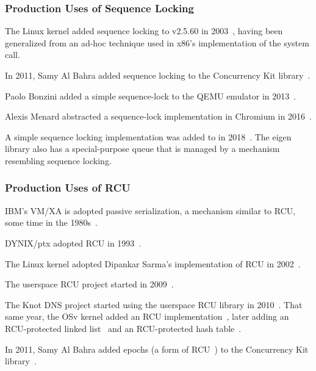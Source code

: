 \subsubsection{Production Uses of Sequence Locking}
\label{sec:defer:Production Uses of Sequence Locking}

The Linux kernel added sequence locking to v2.5.60 in
2003~\cite{JonathanCorbet2003seqlock}, having been generalized from
an ad-hoc technique used in x86's implementation of the
 system call.

In 2011, Samy Al Bahra added sequence locking to the Concurrency Kit
library~\cite{SamyAlBahra2011ckseqlock}.

Paolo Bonzini added a simple sequence-lock to the QEMU emulator in
2013~\cite{PaoloBonzini2013QEMUseqlock}.

Alexis Menard abstracted a sequence-lock implementation in Chromium
in 2016~\cite{AlexisMenard2016ChromiumSeqLock}.

A simple sequence locking implementation was added to 
in 2018~\cite{DavidGoldblatt2018seqlock}.
The eigen library also has a special-purpose queue that is managed by
a mechanism resembling sequence locking.

\subsubsection{Production Uses of RCU}
\label{sec:defer:Production Uses of RCU}

IBM's VM/XA is adopted passive serialization, a mechanism similar to
RCU, some time in the 1980s~\cite{Hennessy89}.

DYNIX/ptx adopted RCU in 1993~\cite{McKenney98,Slingwine95}.

The Linux kernel adopted Dipankar Sarma's implementation of RCU in
2002~\cite{Torvalds2.5.43}.

The userspace RCU project started in 2009~\cite{MathieuDesnoyers2009URCU}.

The Knot DNS project started using the userspace RCU
library in 2010~\cite{LubosSlovak2010KnotDNSRCU}.
That same year, the OSv kernel added an RCU
implementation~\cite{AviKivity2013OSvRCU},
later adding an RCU-protected linked list~\cite{AviKivity2013OSvRCUlist}
and an RCU-protected hash table~\cite{AviKivity2013OSvRCUhash}.

In 2011, Samy Al Bahra added epochs
(a form of RCU~\cite{UCAM-CL-TR-579,KeirFraser2007withoutLocks})
to the Concurrency Kit
library~\cite{SamyAlBahra2011ckEpoch}.

